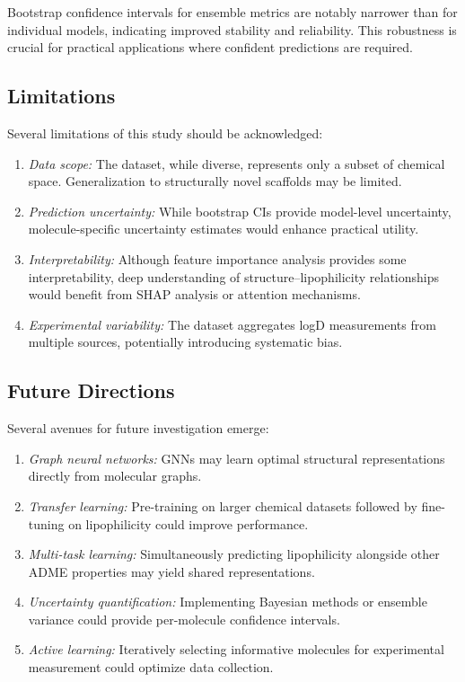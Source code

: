 \documentclass[12pt,a4paper]{article}
\begin{document}
Bootstrap confidence intervals for ensemble metrics are notably narrower than for individual models, indicating improved stability and reliability. This robustness is crucial for practical applications where confident predictions are required.

\subsection{Limitations}

Several limitations of this study should be acknowledged:

\begin{enumerate}
    \item \textit{Data scope:} The dataset, while diverse, represents only a subset of chemical space. Generalization to structurally novel scaffolds may be limited.
    \item \textit{Prediction uncertainty:} While bootstrap CIs provide model-level uncertainty, molecule-specific uncertainty estimates would enhance practical utility.
    \item \textit{Interpretability:} Although feature importance analysis provides some interpretability, deep understanding of structure--lipophilicity relationships would benefit from SHAP analysis \citep{lundberg2017unified} or attention mechanisms.
    \item \textit{Experimental variability:} The dataset aggregates logD measurements from multiple sources, potentially introducing systematic bias.
\end{enumerate}

\subsection{Future Directions}

Several avenues for future investigation emerge:

\begin{enumerate}
    \item \textit{Graph neural networks:} GNNs \citep{gilmer2017neural} may learn optimal structural representations directly from molecular graphs.
    \item \textit{Transfer learning:} Pre-training on larger chemical datasets followed by fine-tuning on lipophilicity could improve performance.
    \item \textit{Multi-task learning:} Simultaneously predicting lipophilicity alongside other ADME properties may yield shared representations.
    \item \textit{Uncertainty quantification:} Implementing Bayesian methods or ensemble variance could provide per-molecule confidence intervals.
    \item \textit{Active learning:} Iteratively selecting informative molecules for experimental measurement could optimize data collection.
\end{enumerate}
\end{document}

